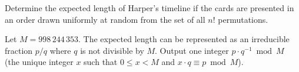 
    Determine the expected length of Harper's timeline if the cards are presented in an order drawn uniformly at random from the set of all $n!$ permutations.

    Let $M = 998\,244\,353$.
    The expected length can be represented as an irreducible fraction $p / q$ where $q$ is not divisible by $M$.
    Output one integer $p \cdot q^{-1} \bmod M$ (the unique integer $x$ such that $0 \le x < M$ and $x \cdot q \equiv p \bmod M$).
